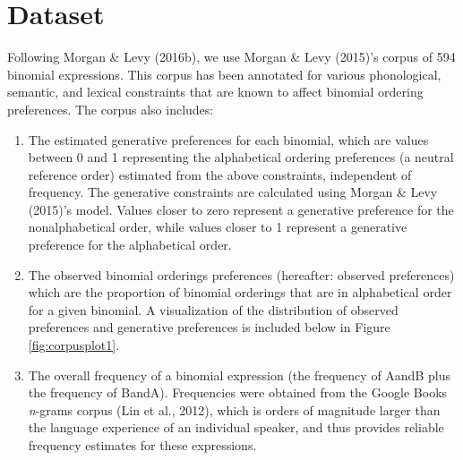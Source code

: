 \documentclass[10pt, letterpaper]{article}
\begin{document}
\hypertarget{dataset}{%
\section{Dataset}\label{dataset}}

Following Morgan \& Levy (2016b), we use Morgan \& Levy (2015)'s corpus
of 594 binomial expressions. This corpus has been annotated for various
phonological, semantic, and lexical constraints that are known to affect
binomial ordering preferences. The corpus also includes:

\begin{enumerate}
\def\labelenumi{\arabic{enumi}.}
\item
  The estimated generative preferences for each binomial, which are
  values between 0 and 1 representing the alphabetical ordering
  preferences (a neutral reference order) estimated from the above
  constraints, independent of frequency. The generative constraints are
  calculated using Morgan \& Levy (2015)'s model. Values closer to zero
  represent a generative preference for the nonalphabetical order, while
  values closer to 1 represent a generative preference for the
  alphabetical order.
\item
  The observed binomial orderings preferences (hereafter: observed
  preferences) which are the proportion of binomial orderings that are
  in alphabetical order for a given binomial. A visualization of the
  distribution of observed preferences and generative preferences is
  included below in Figure \ref{fig:corpusplot1}.
\item
  The overall frequency of a binomial expression (the frequency of AandB
  plus the frequency of BandA). Frequencies were obtained from the
  Google Books \emph{n}-grams corpus (Lin et al., 2012), which is orders
  of magnitude larger than the language experience of an individual
  speaker, and thus provides reliable frequency estimates for these
  expressions.
\end{enumerate}
\end{document}
